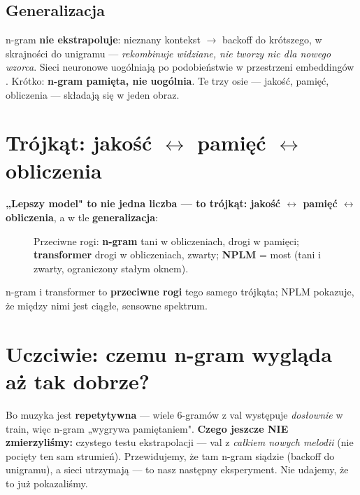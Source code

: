 \documentclass[11pt,a4paper]{article}
\begin{document}
\subsection{Generalizacja}
n-gram \textbf{nie ekstrapoluje}: nieznany kontekst $\to$ backoff do krótszego, w skrajności do unigramu --- \emph{rekombinuje widziane, nie tworzy nic dla nowego wzorca}. Sieci neuronowe uogólniają po podobieństwie w przestrzeni embeddingów \cite{knnlm}. Krótko: \textbf{n-gram pamięta, nie uogólnia}. Te trzy osie --- jakość, pamięć, obliczenia --- składają się w jeden obraz.

\section{Trójkąt: jakość \texorpdfstring{$\leftrightarrow$}{<->} pamięć \texorpdfstring{$\leftrightarrow$}{<->} obliczenia}
\textbf{„Lepszy model" to nie jedna liczba --- to trójkąt: jakość $\leftrightarrow$ pamięć $\leftrightarrow$ obliczenia}, a w tle \textbf{generalizacja}:
\begin{figure}[h]
  \centering
  \caption{Przeciwne rogi: \textbf{n-gram} tani w obliczeniach, drogi w pamięci; \textbf{transformer} drogi w obliczeniach, zwarty; \textbf{NPLM} = most (tani i zwarty, ograniczony stałym oknem).}
  \label{fig:trojkat}
\end{figure}

\noindent n-gram i transformer to \textbf{przeciwne rogi} tego samego trójkąta; NPLM pokazuje, że między nimi jest ciągłe, sensowne spektrum.

\section{Uczciwie: czemu n-gram wygląda aż tak dobrze?}
Bo muzyka jest \textbf{repetytywna} --- wiele 6-gramów z val występuje \emph{dosłownie} w train, więc n-gram „wygrywa pamiętaniem". \textbf{Czego jeszcze NIE zmierzyliśmy:} czystego testu ekstrapolacji --- val z \emph{całkiem nowych melodii} (nie pocięty ten sam strumień). Przewidujemy, że tam n-gram siądzie (backoff do unigramu), a sieci utrzymają --- to nasz następny eksperyment. Nie udajemy, że to już pokazaliśmy.
\end{document}
